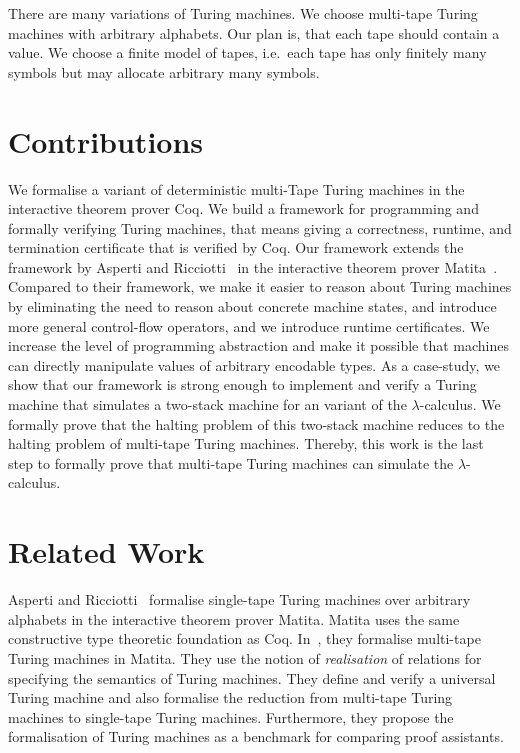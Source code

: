 There are many variations of Turing machines.  We choose multi-tape Turing machines with arbitrary alphabets.  Our plan is, that each tape should
contain a value.  We choose a finite model of tapes, i.e.\ each tape has only finitely many symbols but may allocate arbitrary many symbols.


\section{Contributions}
\label{sec:contributions}

We formalise a variant of deterministic multi-Tape Turing machines in the interactive theorem prover Coq.  We build a framework for programming and
formally verifying Turing machines, that means giving a correctness, runtime, and termination certificate that is verified by Coq.  Our framework
extends the framework by Asperti and Ricciotti~\cite{asperti2015} in the interactive theorem prover Matita~\cite{asperti2011matita}.  Compared to
their framework, we make it easier to reason about Turing machines by eliminating the need to reason about concrete machine states, and introduce more
general control-flow operators, and we introduce runtime certificates.  We increase the level of programming abstraction and make it possible that
machines can directly manipulate values of arbitrary encodable types.  As a case-study, we show that our framework is strong enough to implement and
verify a Turing machine that simulates a two-stack machine for an variant of the $\lambda$-calculus.  We formally prove that the halting problem of
this two-stack machine reduces to the halting problem of multi-tape Turing machines.  Thereby, this work is the last step to formally prove that
multi-tape Turing machines can simulate the $\lambda$-calculus.

\section{Related Work}
\label{sec:relatedwork}

Asperti and Ricciotti~\cite{asperti2012} formalise single-tape Turing machines over arbitrary alphabets in the interactive theorem prover Matita.
Matita uses the same constructive type theoretic foundation as Coq.  In~\cite{asperti2015}, they formalise multi-tape Turing machines in Matita.  They
use the notion of \textit{realisation} of relations for specifying the semantics of Turing machines.  They define and verify a universal Turing
machine and also formalise the reduction from multi-tape Turing machines to single-tape Turing machines.  Furthermore, they propose the formalisation
of Turing machines as a benchmark for comparing proof assistants.

